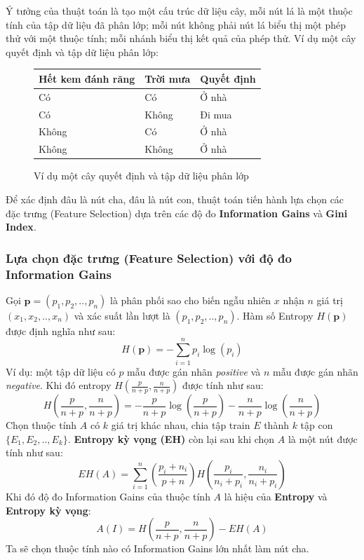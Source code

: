 \documentclass[12pt]{article}
\begin{document}
Ý tưởng của thuật toán là tạo một cấu trúc dữ liệu cây, mỗi nút lá là một thuộc tính của tập dữ liệu đã phân lớp; mỗi nút không phải nút lá biểu thị một phép thử với một thuộc tính; mỗi nhánh biểu thị kết quả của phép thử. Ví dụ một cây quyết định và tập dữ liệu phân lớp:
\begin{figure}[H]
\begin{multicols}{2}

\begin{tabular}{|l|l|l|}
	\hline
	Hết kem đánh răng & Trời mưa & Quyết định \\
	\hline
	Có & Có & Ở nhà \\
	Có & Không & Đi mua \\
	Không & Có & Ở nhà \\
	Không & Không & Ở nhà \\
	\hline
\end{tabular}
\end{multicols}
\caption{Ví dụ một cây quyết định và tập dữ liệu phân lớp}
\end{figure}
Để xác định đâu là nút cha, đâu là nút con, thuật toán tiến hành lựa chọn các đặc trưng (Feature Selection) dựa trên các độ đo \textbf{Information Gains} và \textbf{Gini Index}.

\subsubsection{Lựa chọn đặc trưng (Feature Selection) với độ đo Information Gains}
Gọi $\mathbf{p} = (p_1, p_2, .., p_n)$ là phân phối sao cho biến ngẫu nhiên $x$ nhận $n$ giá trị $(x_1, x_2, .., x_n)$ và xác suất lần lượt là $(p_1, p_2, .., p_n)$. Hàm số Entropy $H(\mathbf{p})$ được định nghĩa như sau:
$$
H(\mathbf{p}) = -\sum_{i = 1}^n p_i \log(p_i)
$$
Ví dụ: một tập dữ liệu có $p$ mẫu được gán nhãn \textit{positive} và $n$ mẫu được gán nhãn \textit{negative}. Khi đó entropy $H(\frac{p}{n + p}, \frac{n}{n + p})$ được tính như sau:
$$
H\left(\frac{p}{n + p}, \frac{n}{n + p}\right) = -\frac{p}{n + p}\log\left(\frac{p}{n + p}\right) - \frac{n}{n + p}\log\left(\frac{n}{n + p}\right)
$$
Chọn thuộc tính $A$ có $k$ giá trị khác nhau, chia tập train $E$ thành $k$ tập con $\{E_1, E_2, .., E_k\}$. \textbf{Entropy kỳ vọng (EH)} còn lại sau khi chọn $A$ là một nút được tính như sau:
$$
EH(A) = \sum_{i = 1}^{n}\left(\frac{p_i + n_i}{p + n}\right)H\left(\frac{p_i}{n_i + p_i}, \frac{n_i}{n_i + p_i}\right)
$$
Khi đó độ đo Information Gains của thuộc tính $A$ là hiệu của \textbf{Entropy} và \textbf{Entropy kỳ vọng}:
$$
A(I) = H\left(\frac{p}{n + p}, \frac{n}{n + p}\right) - EH(A) 
$$
Ta sẽ chọn thuộc tính nào có Information Gains lớn nhất làm nút cha.
\end{document}
